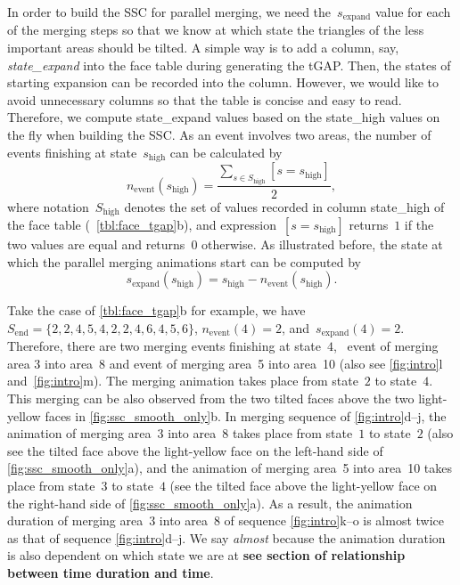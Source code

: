 \documentclass[ijgi,article,submit,moreauthors,pdftex]{Definitions/mdpi}
\begin{document}
In order to build the SSC for parallel merging,
we need the~$s_\mathrm{expand}$ value for each of the merging steps
so that we know at which state 
the triangles of the less important areas should be tilted.
A simple way is to add a column, say, \emph{state\_expand} 
into the face table during generating the tGAP.
Then, the states of starting expansion can be recorded into the column.
However, we would like to avoid unnecessary columns
so that the table is concise and easy to read.
Therefore, we compute state\_expand values 
based on the state\_high values
on the fly when building the SSC.
As an event involves two areas,
the number of events finishing at state~$s_\mathrm{high}$ can be calculated by
\begin{equation}
\label{eq:n_event_state}
n_\mathrm{event} (s_\mathrm{high}) = 
\frac{\sum\limits_{s \in S_\mathrm{high}} [s=s_\mathrm{high}]}{2},
\end{equation}
where notation~$S_\mathrm{high}$ denotes the set of values
recorded in column state\_high of the face table
(\eg~\tbl\ref{tbl:face_tgap}b),
and expression~$[s=s_\mathrm{high}]$ returns~$1$ if the two values are equal 
and returns~$0$ otherwise.
As illustrated before, the state at which the parallel merging animations start 
can be computed by
\begin{equation}
\label{eq:s_expand_state}
s_\mathrm{expand} (s_\mathrm{high}) = s_\mathrm{high} - n_\mathrm{event} (s_\mathrm{high}).
\end{equation}



Take the case of \tbl\ref{tbl:face_tgap}b for example,
we have~$S_\mathrm{end} = \{2, 2, 4, 5, 4, 2, 2, 4, 6, 4, 5, 6\}$, 
$n_\mathrm{event} (4) = 2$, and~$s_\mathrm{expand} (4) = 2$.
Therefore, there are two merging events finishing at state~$4$,
\ie~event of merging area 3 into area~8 and 
event of merging area~5 into area~10 
(also see \figs\ref{fig:intro}l and~\ref{fig:intro}m).
The merging animation takes place from state~$2$ to state~$4$.
This merging can be also observed from 
the two tilted faces above the two light-yellow faces 
in \fig\ref{fig:ssc_smooth_only}b.
In merging sequence of \figs\ref{fig:intro}d--j, 
the animation of merging area~3 into area~8 
takes place from state~$1$ to state~$2$
(also see the tilted face above the light-yellow face 
on the left-hand side of \fig\ref{fig:ssc_smooth_only}a), and 
the animation of merging area~5 into area~10
takes place from state~$3$ to state~$4$
(see the tilted face above the light-yellow face 
on the right-hand side of \fig\ref{fig:ssc_smooth_only}a).
As a result, the animation duration of merging area~3 into area~8 of 
sequence \figs\ref{fig:intro}k--o
is almost twice as that of sequence \figs\ref{fig:intro}d--j.
We say \emph{almost} because the animation duration is also dependent on 
which state we are at 
\textbf{see section of relationship between time duration and time}.
\end{document}
